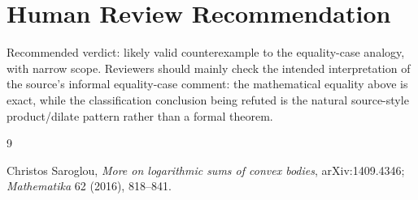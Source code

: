 \documentclass[11pt]{article}
\begin{document}
\section*{Human Review Recommendation}

Recommended verdict: likely valid counterexample to the equality-case analogy,
with narrow scope.  Reviewers should mainly check the intended interpretation
of the source's informal equality-case comment: the mathematical equality
above is exact, while the classification conclusion being refuted is the
natural source-style product/dilate pattern rather than a formal theorem.

\begin{thebibliography}{9}

Christos Saroglou,
\emph{More on logarithmic sums of convex bodies},
arXiv:1409.4346; \emph{Mathematika} 62 (2016), 818--841.

\end{thebibliography}
\end{document}
